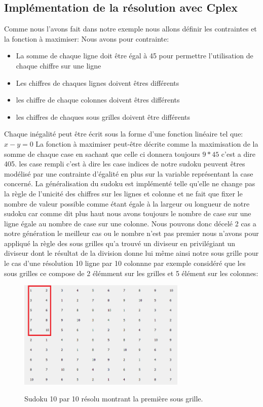\subsection{Implémentation de la résolution avec Cplex}

Comme nous l'avons fait dans notre exemple nous allons définir les contraintes et la fonction à maximiser:
Nous avons pour contrainte:
\begin{itemize}
\item La somme de chaque ligne doit être égal à 45 pour permettre l'utilisation de chaque chiffre sur une ligne
\item Les chiffres de chaques lignes doivent êtres différents
\item les chiffre de chaque colonnes doivent êtres différents
\item les chiffres de chaques sous grilles doivent être différents
\end{itemize}

Chaque inégalité peut être écrit sous la forme d'une fonction linéaire tel que:
\newline
$x-y=0$
\newline
La fonction à maximiser peut-être décrite comme la maximisation de la somme de chaque case en sachant que celle ci donnera toujours $9*45$ c'est a dire 405.
\newline
les case rempli c'est à dire les case indices de notre sudoku peuvent êtres modélisé par une contrainte d'égalité en plus sur la variable représentant la case concerné.\newline
La généralisation du sudoku est implémenté telle qu'elle ne change pas la règle de l'unicité des chiffres sur les lignes et colonne et ne fait que fixer le nombre de valeur possible comme étant égale à la largeur ou longueur de notre sudoku car comme dit plus haut nous avons toujours le nombre de case sur une ligne égale au nombre de case sur une colonne. Nous pouvons donc décelé 2 cas a notre génération le meilleur cas ou le nombre n'est pas premier nous n'avons pour appliqué la règle des sous grilles qu'a trouvé un diviseur en privilégiant un diviseur dont le résultat de la division donne lui même ainsi notre sous grille pour le cas d'une résolution 10 ligne par 10 colonnne par exemple considéré que les sous grilles ce compose de 2 élémment sur les grilles et 5 élément sur les colonnes:

\begin{figure}[h]
  \begin{center}
\includegraphics[width=8cm]{./images/10_10.png}\label{10_10}
\caption{Sudoku 10 par 10 résolu montrant la première sous grille.}
\end{center}
\end{figure}

